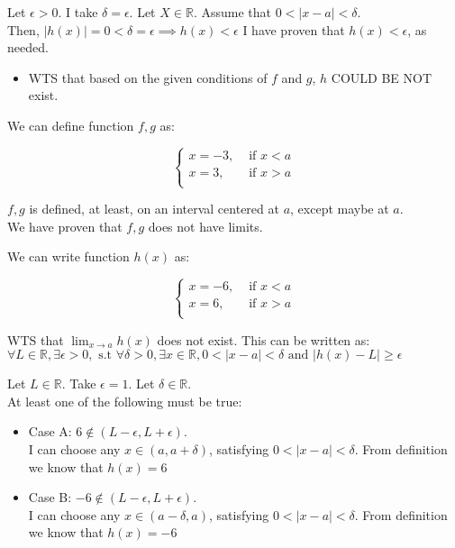 \documentclass[12pt]{exam}
\newcommand {\DS} [1] {${\displaystyle #1}$}
\newcommand{\R}{\mathbb{R}}
\begin{document}
\begin{enumerate}
Let $\epsilon > 0.$ I take $\delta = \epsilon$. Let $X \in \R$. Assume that $0 < |x - a| < \delta$. \\
Then, $|h(x)| = 0 < \delta = \epsilon \implies h(x) < \epsilon$
I have proven that $h(x) < \epsilon$, as needed.


\begin{itemize}
	\item WTS that based on the given conditions of $f$ and $g$, $h$ COULD BE NOT exist.
\end{itemize}


We can define function $f, g$ as: 

$$
\begin{cases}
	x = -3, &\text{ if }x < a\\
	x = 3, &\text{ if } x > a\\
\end{cases}
$$

$f, g$ is defined, at least, on an interval centered at $a$, except maybe at $a$.\\

We have proven that $f, g$ does not have limits.

We can write function $h(x)$ as:

$$
\begin{cases}
	x = -6, &\text{ if }x < a\\
	x = 6, &\text{ if } x > a\\
\end{cases}
$$

WTS that \DS{\lim_{x \to a} h(x)} does not exist.
This can be written as: $\forall L \in \R, \exists \epsilon > 0, \mbox{ s.t } \forall \delta > 0, \exists x \in \R,
 0 < |x - a| < \delta \mbox{ and } |h(x) - L| \geq \epsilon$

Let $L \in \R$. Take $\epsilon = 1$. Let $\delta \in \R$.\\
At least one of the following must be true:

\begin{itemize}
	\item Case A: $6 \notin (L - \epsilon, L + \epsilon).$ \\ 
	I can choose any $x \in (a, a + \delta)$, satisfying $0 < |x - a| < \delta$. 
	From definition we know that $h(x) = 6$
\end{itemize}

\begin{itemize}
	\item Case B: $-6 \notin (L - \epsilon, L + \epsilon).$ \\ 
	I can choose any $x \in (a - \delta, a )$, satisfying $0 < |x - a| < \delta$. 
	From definition we know that $h(x) = -6$
\end{itemize}


\end{enumerate}
\end{document}
